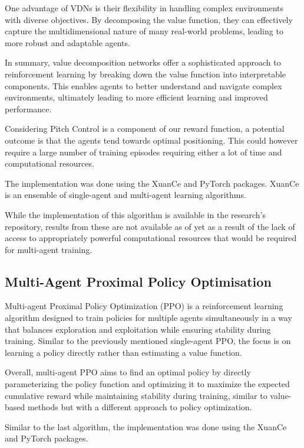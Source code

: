 \documentclass[11pt]{article}
\begin{document}
One advantage of VDNs is their flexibility in handling complex environments with diverse objectives. By decomposing the value function, they can effectively capture the multidimensional nature of many real-world problems, leading to more robust and adaptable agents.

In summary, value decomposition networks offer a sophisticated approach to reinforcement learning by breaking down the value function into interpretable components. This enables agents to better understand and navigate complex environments, ultimately leading to more efficient learning and improved performance.

Considering Pitch Control is a component of our reward function, a potential outcome is that the agents tend towards optimal positioning. This could however require a large number of training episodes requiring either a lot of time and computational resources.

The implementation was done using the XuanCe \cite{liu2023xuance} and PyTorch \cite{paszke2019pytorch} packages. XuanCe is an ensemble of single-agent and multi-agent learning algorithms.

While the implementation of this algorithm is available in the research's repository, results from these are not available as of yet as a result of the lack of access to appropriately powerful computational resources that would be required for multi-agent training.

\subsection{Multi-Agent Proximal Policy Optimisation}

Multi-agent Proximal Policy Optimization (PPO) is a reinforcement learning algorithm designed to train policies for multiple agents simultaneously in a way that balances exploration and exploitation while ensuring stability during training. Similar to the previously mentioned single-agent PPO, the focus is on learning a policy directly rather than estimating a value function.


Overall, multi-agent PPO aims to find an optimal policy by directly parameterizing the policy function and optimizing it to maximize the expected cumulative reward while maintaining stability during training, similar to value-based methods but with a different approach to policy optimization.

Similar to the last algorithm, the implementation was done using the XuanCe \cite{liu2023xuance} and PyTorch \cite{paszke2019pytorch} packages.
\end{document}
